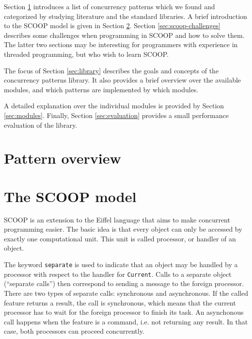 \documentclass[a4paper,10pt]{article}
\begin{document}
Section \ref{sec:pattern_overview} introduces a list of concurrency patterns which we found and categorized by studying literature and the standard libraries.
A brief introduction to the SCOOP model is given in Section \ref{sec:scoop-model}.
Section \ref{sec:scoop-challenges} describes some challenges when programming in SCOOP and how to solve them.
The latter two sections may be interesting for programmers with experience in threaded programming, but who wish to learn SCOOP.

The focus of Section \ref{sec:library} describes the goals and concepts of the concurrency patterns library.
It also provides a brief overview over the available modules, and which patterns are implemented by which modules.

A detailed explanation over the individual modules is provided by Section \ref{sec:modules}.
Finally, Section \ref{sec:evaluation} provides a small performance evaluation of the library.

\section {Pattern overview}
\label{sec:pattern_overview}



\section {The SCOOP model}
\label {sec:scoop-model}

SCOOP is an extension to the Eiffel language  that aims to make concurrent programming easier.
The basic idea is that every object can only be accessed by exactly one computational unit.
This unit is called processor, or handler of an object.

The keyword \lstinline!separate! is used to indicate that an object may be handled by a processor with respect to the handler for \lstinline!Current!.
Calls to a separate object (``separate calls'') then correspond to sending a message to the foreign processor.
There are two types of separate calls: synchronous and asynchronous.
If the called feature returns a result, the call is synchronous, which means that the current processor has to wait for the foreign processor to finish its task.
An asynchonous call happens when the feature is a command, i.e. not returning any result.
In that case, both processors can proceed concurrently.
\end{document}
